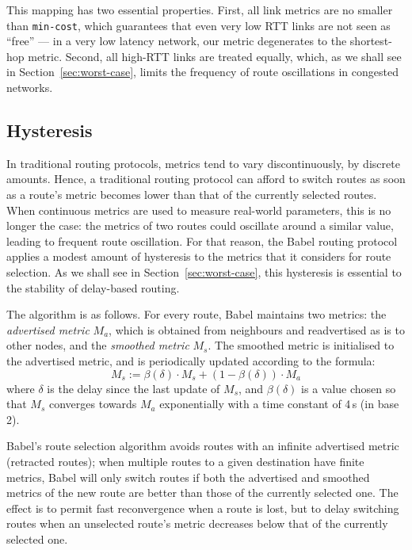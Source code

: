 \documentclass[conference,letterpaper]{IEEEtran}
\begin{document}
This mapping has two essential properties.  First, all link metrics
are no smaller than \texttt{min-cost}, which guarantees that even very
low RTT links are not seen as ``free'' --- in a very low latency
network, our metric degenerates to the shortest-hop metric.  Second,
all high-RTT links are treated equally, which, as we shall see in
Section~\ref{sec:worst-case}, limits the frequency of route
oscillations in congested networks.

\subsection{Hysteresis}

In traditional routing protocols, metrics tend to vary
discontinuously, by discrete amounts.  Hence, a traditional routing
protocol can afford to switch routes as soon as a route's metric
becomes lower than that of the currently selected routes.  When
continuous metrics are used to measure real-world parameters, this is
no longer the case: the metrics of two routes could oscillate around
a similar value, leading to frequent route oscillation.  For that
reason, the Babel routing protocol applies a modest amount of
hysteresis to the metrics that it considers for route selection.  As
we shall see in Section~\ref{sec:worst-case}, this hysteresis is
essential to the stability of delay-based routing.

The algorithm is as follows.  For every route, Babel maintains two
metrics: the \emph{advertised metric} $M_a$, which is obtained from
neighbours and readvertised as is to other nodes, and the
\emph{smoothed metric} $M_s$.  The smoothed metric is initialised to
the advertised metric, and is periodically updated according to the
formula:
\[ M_s := \beta(\delta)\cdot M_s + (1 - \beta(\delta))\cdot M_a \]
where $\delta$ is the delay since the last update of $M_s$, and
$\beta(\delta)$ is a value chosen so that $M_s$ converges towards
$M_a$ exponentially with a time constant of 4\,s (in base 2).

Babel's route selection algorithm avoids routes with an infinite
advertised metric (retracted routes); when multiple routes to a given
destination have finite metrics, Babel will only switch routes if both
the advertised and smoothed metrics of the new route are better than
those of the currently selected one.  The effect is to permit fast
reconvergence when a route is lost, but to delay switching routes when
an unselected route's metric decreases below that of the currently
selected one.
\end{document}
